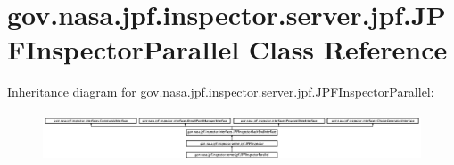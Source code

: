 \hypertarget{classgov_1_1nasa_1_1jpf_1_1inspector_1_1server_1_1jpf_1_1_j_p_f_inspector_parallel}{}\section{gov.\+nasa.\+jpf.\+inspector.\+server.\+jpf.\+J\+P\+F\+Inspector\+Parallel Class Reference}
\label{classgov_1_1nasa_1_1jpf_1_1inspector_1_1server_1_1jpf_1_1_j_p_f_inspector_parallel}
Inheritance diagram for gov.\+nasa.\+jpf.\+inspector.\+server.\+jpf.\+J\+P\+F\+Inspector\+Parallel\+:\begin{figure}[H]
\begin{center}
\leavevmode
\includegraphics[height=1.454545cm]{classgov_1_1nasa_1_1jpf_1_1inspector_1_1server_1_1jpf_1_1_j_p_f_inspector_parallel}
\end{center}
\end{figure}
